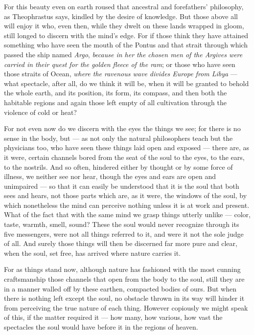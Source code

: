  For this beauty even on earth roused that ancestral and forefathers' philosophy, as Theophrastus says, kindled by the desire of knowledge. But those above all will enjoy it who, even then, while they dwelt on these lands wrapped in gloom, still longed to discern with the mind's edge. For if those think they have attained something who have seen the mouth of the Pontus and that strait through which passed the ship named \textit{Argo}, \textit{because in her the chosen men of the Argives were carried in their quest for the golden fleece of the ram}; or those who have seen those straits of Ocean, \textit{where the ravenous wave divides Europe from Libya} — what spectacle, after all, do we think it will be, when it will be granted to behold the whole earth, and its position, its form, its compass, and then both the habitable regions and again those left empty of all cultivation through the violence of cold or heat?

 For not even now do we discern with the eyes the things we see; for there is no sense in the body, but — as not only the natural philosophers teach but the physicians too, who have seen these things laid open and exposed — there are, as it were, certain channels bored from the seat of the soul to the eyes, to the ears, to the nostrils. And so often, hindered either by thought or by some force of illness, we neither see nor hear, though the eyes and ears are open and unimpaired — so that it can easily be understood that it is the soul that both sees and hears, not those parts which are, as it were, the windows of the soul, by which nonetheless the mind can perceive nothing unless it is at work and present. What of the fact that with the same mind we grasp things utterly unlike — color, taste, warmth, smell, sound? These the soul would never recognize through its five messengers, were not all things referred to it, and were it not the sole judge of all. And surely those things will then be discerned far more pure and clear, when the soul, set free, has arrived where nature carries it.

 For as things stand now, although nature has fashioned with the most cunning craftsmanship those channels that open from the body to the soul, still they are in a manner walled off by these earthen, compacted bodies of ours. But when there is nothing left except the soul, no obstacle thrown in its way will hinder it from perceiving the true nature of each thing. However copiously we might speak of this, if the matter required it — how many, how various, how vast the spectacles the soul would have before it in the regions of heaven.

